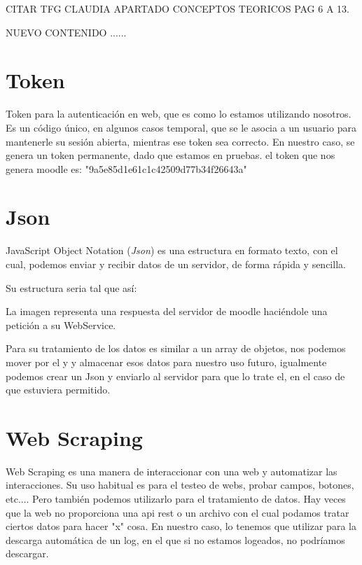 
CITAR TFG CLAUDIA APARTADO CONCEPTOS TEORICOS PAG 6 A 13.

NUEVO CONTENIDO ......




\section{Token}\label{token}

Token para la autenticación en web, que es como lo estamos utilizando nosotros. Es un código único, en algunos casos temporal, que se le asocia a un usuario para mantenerle su sesión abierta, mientras ese token sea correcto. En nuestro caso, se genera un token permanente, dado que estamos en pruebas. el token que nos genera moodle es: "9a5e85d1e61c1c42509d77b34f26643a"

\section{Json}\label{json}

JavaScript Object Notation (\emph{Json}) es una estructura en formato texto, con el cual, podemos enviar y recibir datos de un servidor, de forma rápida y sencilla. 

Su estructura seria tal que así:


La imagen representa una respuesta del servidor de moodle haciéndole una petición a su WebService.

Para su tratamiento de los datos es similar a un array de objetos, nos podemos mover por el y y almacenar esos datos para nuestro uso futuro, igualmente podemos crear un Json y enviarlo al servidor para que lo trate el, en el caso de que estuviera permitido.

\section{Web Scraping}\label{web-scraping}

Web Scraping es una manera de interaccionar con una web y automatizar las interacciones. Su uso habitual es para  el testeo de webs, probar campos, botones, etc.... Pero también podemos utilizarlo para el tratamiento de datos. Hay veces que la web no proporciona una api rest o un archivo con el cual podamos tratar ciertos datos para hacer "x" cosa. En nuestro caso, lo tenemos que utilizar para la descarga automática de un log, en el que si no estamos logeados, no podríamos descargar.

